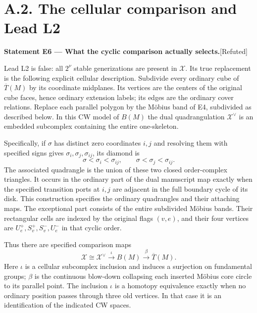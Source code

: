 \documentclass[11pt,a4paper]{article}
\newenvironment{resultenv}[3]{\par\medskip\phantomsection\label{#1}\noindent\textbf{Statement #1 --- #3.}\quad\textsf{[#2]}\par\smallskip\noindent\ignorespaces}{\par\medskip}
\begin{document}
\section{A.2. The cellular comparison and Lead L2}
\begin{resultenv}{E6}{Refuted}{What the cyclic comparison actually selects}
Lead L2 is false: all $2^\nu$ stable generizations are present in
$\mathcal X$. Its true replacement is the following explicit cellular
description. Subdivide every ordinary cube of $\overline T(M)$ by its
coordinate midplanes. Its vertices are the centers of the original cube
faces, hence ordinary extension labels; its edges are the ordinary cover
relations. Replace each parallel polygon by the M\"obius band of E4,
subdivided as described below. In this CW model of $B(M)$ the dual
quadrangulation $\mathcal X^\vee$ is an embedded subcomplex containing
the entire one-skeleton.

Specifically, if $\sigma$ has distinct zero coordinates $i,j$ and resolving them
with specified signs gives $\sigma_i,\sigma_j,\sigma_{ij}$, its diamond is
\[
 \sigma<\sigma_i<\sigma_{ij},\qquad
 \sigma<\sigma_j<\sigma_{ij}.
\]
The associated quadrangle is the union of these two closed order-complex
triangles. It occurs in the ordinary part of the dual manuscript map
exactly when the specified transition ports at $i,j$ are adjacent in the
full boundary cycle of its disk. This construction specifies the ordinary
quadrangles and their attaching maps. The exceptional part consists of
the entire subdivided M\"obius bands. Their rectangular cells are indexed
by the original flags $(v,e)$, and their four vertices are
$U_e^+,S_v^+,S_v^-,U_e^-$ in that cyclic order.

Thus there are specified comparison maps
\[
 \mathcal X\cong\mathcal X^\vee
 \xrightarrow{\ \iota\ }B(M)
 \xrightarrow{\ \beta\ }\overline T(M).
\]
Here $\iota$ is a cellular subcomplex inclusion and induces a surjection on
fundamental groups; $\beta$ is the continuous blow-down collapsing each inserted M\"obius core circle
to its parallel point. The inclusion $\iota$ is a homotopy equivalence
exactly when no ordinary position passes through three old vertices.
In that case it is an identification of the indicated CW spaces.
\end{resultenv}
\end{document}
